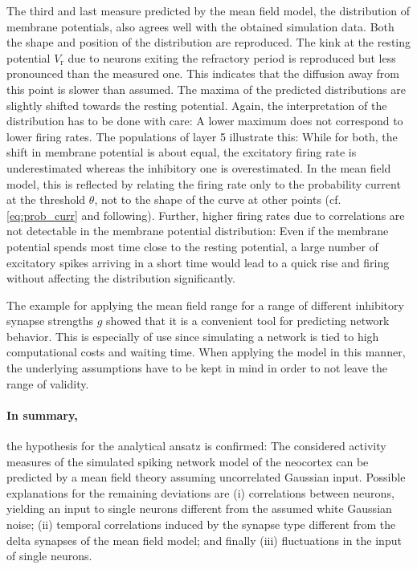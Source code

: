 The third and last measure predicted by the mean field model, the distribution of 
membrane potentials, also agrees well with the obtained simulation data. 
Both the shape and position of the distribution are reproduced.
The kink at the resting potential $V_\text{r}$ due to neurons exiting the 
refractory period is reproduced but less pronounced than the measured one. 
This indicates that the diffusion
away from this point is slower than assumed. 
The maxima of the predicted distributions are slightly 
shifted towards the resting potential. 
Again, the interpretation of the distribution has to be done with care:
A lower maximum does not correspond to lower firing rates. 
The populations of layer 5 illustrate this: While for both, the shift in membrane 
potential is about equal, the excitatory firing rate is underestimated whereas the 
inhibitory one is overestimated. 
In the mean field model, this is reflected by relating the firing rate 
only to the probability current at the threshold $\theta$, not to the 
shape of the curve at other points (cf. \autoref{eq:prob_curr} and following).
Further, higher firing rates due to correlations are not detectable in the 
membrane potential distribution: 
Even if the membrane potential spends most time close to the resting potential, 
a large number of excitatory spikes arriving in a short time would lead to a quick rise and
firing without affecting the distribution significantly.  

The example for applying the mean field range for a range of different inhibitory 
synapse strengths $g$ showed that it is a convenient tool for predicting 
network behavior. This is especially of use since simulating a network is tied 
to high computational costs and waiting time. When applying the model in this manner, 
the underlying assumptions have to be kept in mind in order to not leave the 
range of validity. 

\paragraph{In summary,} the hypothesis for the analytical ansatz is confirmed: 
The considered activity measures of the simulated spiking network model of the neocortex 
can be predicted by a mean field theory assuming uncorrelated Gaussian input.
Possible explanations for the remaining deviations are (i) correlations between neurons, 
yielding an input to single neurons different from the assumed white Gaussian noise;
(ii) temporal correlations induced by the synapse type different from the 
delta synapses of the mean field model; and finally (iii) fluctuations in the 
input of single neurons. 

